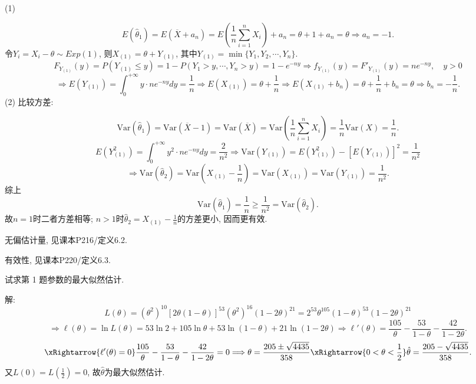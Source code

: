 \documentclass[standard]{ExBook}
\renewenvironment{shaded}{%
  \def\FrameCommand{\fboxsep=\FrameSep \colorbox{shadecolor}}%
  \MakeFramed{\advance\hsize-\width \FrameRestore}%
}{%
  \endMakeFramed
}
\begin{document}
\begin{qitems}
(1)

$$
E(\hat{\theta}_1)
=E(\overline{X}+a_n)
=E\left(\frac{1}{n}\sum\limits_{i=1}^{n}X_i\right)+a_n
=\theta+1+a_n
=\theta
\Longrightarrow
a_n=-1.
$$
令$Y_i=X_i-\theta \sim Exp(1)$, 则$X_{(1)}=\theta+Y_{(1)}$, 其中$Y_{(1)}=\min\{Y_1,Y_2,\cdots,Y_n\}$.
$$
F_{Y_{(1)}}(y)=P(Y_{(1)}\leq y)=1-P(Y_1>y,\cdots,Y_n>y)
=1-e^{-ny}
\Longrightarrow
f_{Y_{(1)}}(y)=F'_{Y_{(1)}}(y)=ne^{-ny},\quad y>0
$$
$$
\Longrightarrow
E(Y_{(1)})=\int_{0}^{+\infty}y\cdot ne^{-ny}dy=\frac{1}{n}
\Longrightarrow
E(X_{(1)})=\theta+\frac{1}{n}
\Longrightarrow
E(X_{(1)}+b_n)=\theta+\frac{1}{n}+b_n=\theta
\Longrightarrow
b_n=-\frac{1}{n}.
$$
(2) 比较方差:

$$
\mathrm{Var}(\hat{\theta}_1)
=\mathrm{Var}(\overline{X}-1)
=\mathrm{Var}(\overline{X})
=\mathrm{Var}\left(\frac{1}{n}\sum\limits_{i=1}^{n}X_i\right)
=\frac{1}{n}\mathrm{Var}(X)
=\frac{1}{n}.
$$
$$
E(Y_{(1)}^2)=\int_{0}^{+\infty}y^2\cdot ne^{-ny}dy=\frac{2}{n^2}
\Longrightarrow
\mathrm{Var}(Y_{(1)})=E(Y_{(1)}^2)-[E(Y_{(1)})]^2
=\frac{1}{n^2}
$$
$$
\Longrightarrow
\mathrm{Var}(\hat{\theta}_2)
=\mathrm{Var}\left(X_{(1)}-\frac{1}{n}\right)
=\mathrm{Var}(X_{(1)})
=\mathrm{Var}(Y_{(1)})
=\frac{1}{n^2}.
$$
综上
$$
\mathrm{Var}(\hat{\theta}_1)=\frac{1}{n} \geq \frac{1}{n^2}=\mathrm{Var}(\hat{\theta}_2).
$$
故$n=1$时二者方差相等; $n>1$时$\hat{\theta}_2=X_{(1)}-\frac{1}{n}$的方差更小, 因而更有效.

\textcolor{themeColor}{\selectfont {} 无偏估计量, 见课本P216/定义6.2.}

\textcolor{themeColor}{\selectfont {} 有效性, 见课本P220/定义6.3.}

\vspace{2.5cm-5em}

    \begin{bbox}
    \begin{shaded}
        \qitem
试求第 1 题参数的最大似然估计.
    \end{shaded}
    \end{bbox}

\vspace{\dimexpr2.5cm-5em\relax}

解: 
$$
L(\theta)
=(\theta^2)^{10}[2\theta(1-\theta)]^{53}(\theta^2)^{16}(1-2\theta)^{21}
=2^{53}\theta^{105}(1-\theta)^{53}(1-2\theta)^{21}
$$
$$
\Longrightarrow
\ell(\theta)=\ln L(\theta)
=53\ln2+105\ln\theta+53\ln(1-\theta)+21\ln(1-2\theta)
\Longrightarrow
\ell'(\theta)
=\frac{105}{\theta}-\frac{53}{1-\theta}-\frac{42}{1-2\theta}.
$$
$$
\xRightarrow{\ell'(\theta)=0}
\frac{105}{\theta}-\frac{53}{1-\theta}-\frac{42}{1-2\theta}=0
\Longrightarrow
\theta=\frac{205\pm\sqrt{4435}}{358}
\xRightarrow{0<\theta<\frac{1}{2}}
\hat{\theta}
=\frac{205-\sqrt{4435}}{358}.
$$
又$L(0)=L\left(\frac{1}{2}\right)=0$, 故$\hat{\theta}$为最大似然估计.


\end{qitems}
\end{document}
